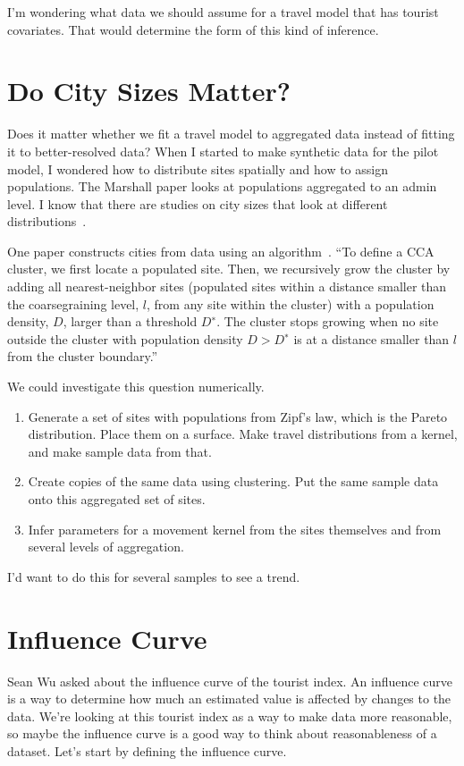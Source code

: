 \documentclass{article}
\begin{document}
I'm wondering what data we should assume for a travel model that has tourist covariates. That would determine the form of this kind of inference.

\section{Do City Sizes Matter?}

Does it matter whether we fit a travel model to aggregated data instead of fitting it to better-resolved data? When I started to make synthetic data for the pilot model, I wondered how to distribute sites spatially and how to assign populations. The Marshall paper looks at populations aggregated to an admin level. I know that there are studies on city sizes that look at different distributions~\cite{giesen2010size,eeckhout2004gibrat}.

One paper constructs cities from data using an algorithm~\cite{rozenfeld2008laws,rozenfeld2011area}. ``To define
a CCA cluster, we first locate a populated site. Then, we recursively grow the cluster by
adding all nearest-neighbor sites (populated sites within a distance smaller than the coarsegraining level, $l$, from any site within the cluster) with a population density, $D$, larger than
a threshold $D^∗$. The cluster stops growing when no site outside the cluster with population
density $D > D^∗$ is at a distance smaller than $l$ from the cluster boundary.''

We could investigate this question numerically.
\begin{enumerate}
  \item Generate a set of sites with populations from Zipf's law, which is the Pareto distribution. Place them on a surface. Make travel distributions from a kernel, and make sample data from that.
  \item Create copies of the same data using clustering. Put the same sample data onto this aggregated set of sites.
  \item Infer parameters for a movement kernel from the sites themselves and from several levels of aggregation.
\end{enumerate}
I'd want to do this for several samples to see a trend.


\section{Influence Curve}

Sean Wu asked about the influence curve of the tourist index. An influence curve is a way to determine how much an estimated value is affected by changes to the data. We're looking at this tourist index as a way to make data more reasonable, so maybe the influence curve is a good way to think about reasonableness of a dataset. Let's start by defining the influence curve.
\end{document}
